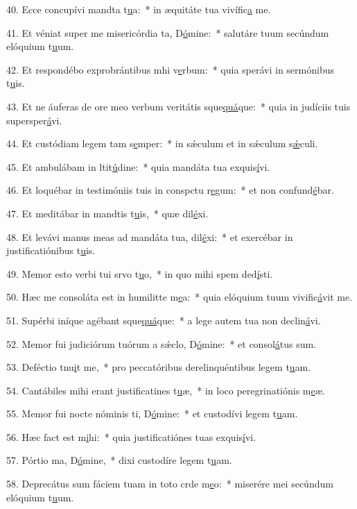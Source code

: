 40. Ecce concupívi mandta t\uline{u}a:~* in æquitáte tua vivífic\uline{a} me.\par 
41. Et véniat super me misericórdia ta, D\uline{ó}mine:~* salutáre tuum secúndum elóquium t\uline{u}um.\par 
42. Et respondébo exprobrántibus mhi v\uline{e}rbum:~* quia sperávi in sermónibus t\uline{u}is.\par 
43. Et ne áuferas de ore meo verbum veritátis sque\uline{quá}que:~* quia in judíciis tuis supersper\uline{á}vi.\par 
44. Et custódiam legem tam s\uline{e}mper:~* in sǽculum et in sǽculum s\uline{ǽ}culi.\par 
45. Et ambulábam in ltit\uline{ú}dine:~* quia mandáta tua exquis\uline{í}vi.\par 
46. Et loquébar in testimóniis tuis in conspctu r\uline{e}gum:~* et non confund\uline{é}bar.\par 
47. Et meditábar in mandtis t\uline{u}is,~* quæ dil\uline{é}xi.\par 
48. Et levávi manus meas ad mandáta tua,  dil\uline{é}xi:~* et exercébar in justificatiónibus t\uline{u}is.\par 
49. Memor esto verbi tui srvo t\uline{u}o,~* in quo mihi spem ded\uline{í}sti.\par 
50. Hæc me consoláta est in humilitte m\uline{e}a:~* quia elóquium tuum vivific\uline{á}vit me.\par 
51. Supérbi iníque agébant sque\uline{quá}que:~* a lege autem tua non declin\uline{á}vi.\par 
52. Memor fui judiciórum tuórum a sǽclo, D\uline{ó}mine:~* et consol\uline{á}tus sum.\par 
53. Deféctio tnu\uline{i}t me,~* pro peccatóribus derelinquéntibus legem t\uline{u}am.\par 
54. Cantábiles mihi erant justificatines t\uline{u}æ,~* in loco peregrinatiónis m\uline{e}æ.\par 
55. Memor fui nocte nóminis ti, D\uline{ó}mine:~* et custodívi legem t\uline{u}am.\par 
56. Hæc fact est m\uline{i}hi:~* quia justificatiónes tuas exquis\uline{í}vi.\par 
57. Pórtio ma, D\uline{ó}mine,~* dixi custodíre legem t\uline{u}am.\par 
58. Deprecátus sum fáciem tuam in toto crde m\uline{e}o:~* miserére mei secúndum elóquium t\uline{u}um.\par 
